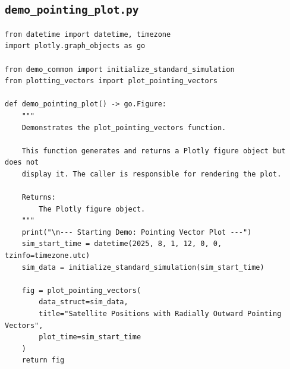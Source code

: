 \documentclass[11pt]{article}
\begin{document}
\subsection{\texttt{demo\_pointing\_plot.py}}
\begin{Verbatim}
from datetime import datetime, timezone
import plotly.graph_objects as go

from demo_common import initialize_standard_simulation
from plotting_vectors import plot_pointing_vectors

def demo_pointing_plot() -> go.Figure:
    """
    Demonstrates the plot_pointing_vectors function.

    This function generates and returns a Plotly figure object but does not
    display it. The caller is responsible for rendering the plot.

    Returns:
        The Plotly figure object.
    """
    print("\n--- Starting Demo: Pointing Vector Plot ---")
    sim_start_time = datetime(2025, 8, 1, 12, 0, 0, tzinfo=timezone.utc)
    sim_data = initialize_standard_simulation(sim_start_time)

    fig = plot_pointing_vectors(
        data_struct=sim_data,
        title="Satellite Positions with Radially Outward Pointing Vectors",
        plot_time=sim_start_time
    )
    return fig
\end{Verbatim}
\end{document}
